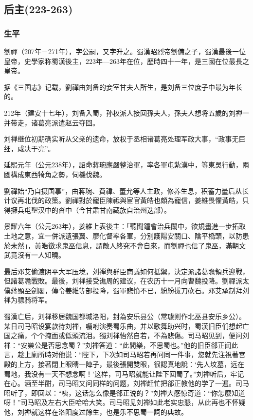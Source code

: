 
\subsection{后主\tiny(223-263)}

\subsubsection{生平}

劉禪（207年－271年），字公嗣，又字升之。蜀漢昭烈帝劉備之子，蜀漢最後一位皇帝，史學家称蜀漢後主，223年—263年在位，歷時四十一年，是三國在位最長之皇帝。

据《三国志》记载，劉禪由刘备的妾室甘夫人所生，是刘备三位庶子中最为年长的。

212年（建安十七年），刘备入蜀，孙权派人接回孫夫人，孫夫人想将五歲的刘禅一并带走，诸葛亮派遣赵云夺回。

刘禅继位初期确实听从父亲的遗命，放权于丞相诸葛亮处理军政大事，“政事无巨细，咸决于亮”。

延熙元年（公元238年），詔命蔣琬應嚴整治軍，率各軍屯紮漢中，等東吳行動，兩國構成東西犄角之勢，伺機伐魏。

劉禪始“乃自摄国事”，由蔣琬、費禕、董允等人主政，修养生息，积蓄力量后从长计议再北伐的政策。劉禪對於寵臣陳祗與宦官黃皓也頗為寵信，姜維畏懼黃皓，只得擁兵屯墾汉中的沓中（今甘肃甘南藏族自治州迭部）。

景耀六年（公元263年），姜維上表後主：「聽聞鐘會治兵關中，欲規畫進一步拓取土地之意，宜一併派遺張翼、廖化督率各軍，分別護陽安關口、陰平橋頭，以防患於未然」，黃皓徵求鬼巫信息，謂敵人終究不會自來，而劉禪也信了鬼巫，滿朝文武竟沒有一人知曉。

最后邓艾偷渡阴平大军压境，刘禅與群臣商議如何抵禦，決定派諸葛瞻領兵迎戰，但諸葛瞻戰敗。最後，刘禅接受谯周的建议，在农历十一月向曹魏投降。劉禪派太僕蔣顯至劍閣，傳令姜維等部投降，蜀軍悲憤不已，紛紛拔刀砍石。邓艾承制拜刘禅为骠骑将军。

蜀漢亡后，刘禅移居魏国都城洛阳，封為安乐县公（常璩则作北巫县安乐乡公）。某日司马昭设宴款待刘禅，囑咐演奏蜀乐曲，并以歌舞助兴时，蜀漢旧臣们想起亡国之痛，个个掩面或低頭流泪。獨刘禅怡然自若，不為悲傷。司马昭见到，便问刘禅：“安樂公是否思念蜀？”刘禅答道：“此間樂，不思蜀也。”他的旧臣郤正闻此言，趁上廁所時对他说：“陛下，下次如司马昭若再问同一件事，您就先注視著宮殿的上方，接著閉上眼睛一陣子，最後張開雙眼，很認真地說：‘先人坟墓，远在蜀地，我没有一天不想念啊！’这样，司马昭就能让陛下回蜀了。”刘禅听后，牢记在心。酒至半酣，司马昭又问同样的问题，刘禅赶忙把郤正教他的学了一遍。司马昭听了，即回以：“咦，这话怎么像是郤正说的？”刘禅大感惊奇道：“你怎麼知道呀！”司马昭及左右大臣哈哈大笑。司马昭见刘禅如此老实忠懇，从此再也不怀疑他，刘禅就这样在洛阳度过餘生，也是乐不思蜀一詞的典故。

